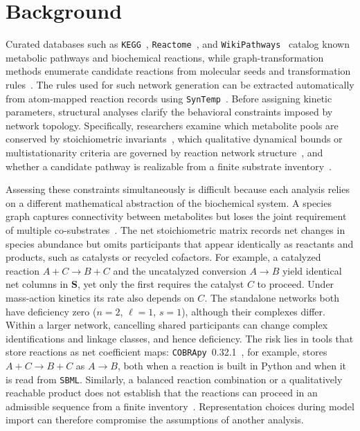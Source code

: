 \documentclass[10pt,a4paper,fleqn]{article}
\begin{document}
\section{Background}
\label{sec:intro}

Curated databases such as \texttt{KEGG}~\cite{kanehisa2025kegg}, \texttt{Reactome}~\cite{ragueneau2026reactome}, and \texttt{WikiPathways}~\cite{agrawal2024wikipathways} catalog known metabolic pathways and biochemical reactions, while graph-transformation methods enumerate candidate reactions from molecular seeds and transformation rules~\cite{andersen2016mod}. The rules used for such network generation can be extracted automatically from atom-mapped reaction records using \texttt{SynTemp}~\cite{phan2025syntemp}. Before assigning kinetic parameters, structural analyses clarify the behavioral constraints imposed by network topology. Specifically, researchers examine which metabolite pools are conserved by stoichiometric invariants~\cite{famili2003leftnullspace}, which qualitative dynamical bounds or multistationarity criteria are governed by reaction network structure~\cite{feinberg1987deficiency,gunawardena2003crnt}, and whether a candidate pathway is realizable from a finite substrate inventory~\cite{andersen2023realisability}.

Assessing these constraints simultaneously is difficult because each analysis relies on a different mathematical abstraction of the biochemical system. A species graph captures connectivity between metabolites but loses the joint requirement of multiple co-substrates~\cite{franzese2019hypergraph}. The net stoichiometric matrix records net changes in species abundance but omits participants that appear identically as reactants and products, such as catalysts or recycled cofactors. For example, a catalyzed reaction $A+C\to B+C$ and the uncatalyzed conversion $A\to B$ yield identical net columns in $\mathbf S$, yet only the first requires the catalyst $C$ to proceed. Under mass-action kinetics its rate also depends on $C$. The standalone networks both have deficiency zero ($n=2$, $\ell=1$, $s=1$), although their complexes differ. Within a larger network, cancelling shared participants can change complex identifications and linkage classes, and hence deficiency. The risk lies in tools that store reactions as net coefficient maps: \texttt{COBRApy}~0.32.1~\cite{ebrahim2013cobrapy}, for example, stores $A+C\to B+C$ as $A\to B$, both when a reaction is built in Python and when it is read from \texttt{SBML}. Similarly, a balanced reaction combination or a qualitatively reachable product does not establish that the reactions can proceed in an admissible sequence from a finite inventory~\cite{andersen2023realisability}. Representation choices during model import can therefore compromise the assumptions of another analysis.
\end{document}
